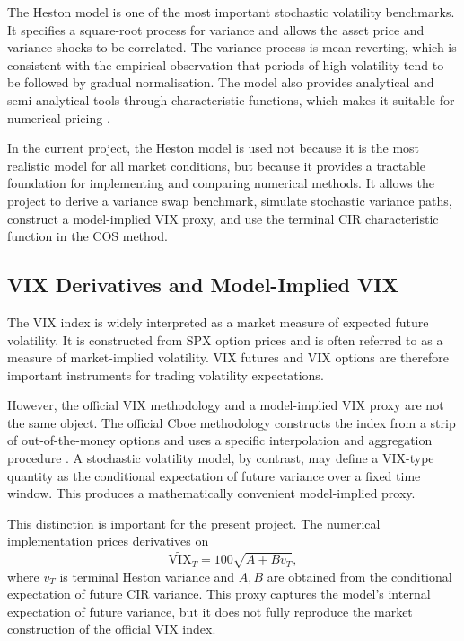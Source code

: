The Heston model is one of the most important stochastic volatility benchmarks. It specifies a square-root process for variance and allows the asset price and variance shocks to be correlated. The variance process is mean-reverting, which is consistent with the empirical observation that periods of high volatility tend to be followed by gradual normalisation. The model also provides analytical and semi-analytical tools through characteristic functions, which makes it suitable for numerical pricing \citep{hirsa2024}.

In the current project, the Heston model is used not because it is the most realistic model for all market conditions, but because it provides a tractable foundation for implementing and comparing numerical methods. It allows the project to derive a variance swap benchmark, simulate stochastic variance paths, construct a model-implied VIX proxy, and use the terminal CIR characteristic function in the COS method.

\subsection{VIX Derivatives and Model-Implied VIX}

The VIX index is widely interpreted as a market measure of expected future volatility. It is constructed from SPX option prices and is often referred to as a measure of market-implied volatility. VIX futures and VIX options are therefore important instruments for trading volatility expectations.

However, the official VIX methodology and a model-implied VIX proxy are not the same object. The official Cboe methodology constructs the index from a strip of out-of-the-money options and uses a specific interpolation and aggregation procedure \citep{cboe2024vix}. A stochastic volatility model, by contrast, may define a VIX-type quantity as the conditional expectation of future variance over a fixed time window. This produces a mathematically convenient model-implied proxy.

This distinction is important for the present project. The numerical implementation prices derivatives on
\[
\widetilde{\mathrm{VIX}}_T
=
100\sqrt{A+Bv_T},
\]
where \(v_T\) is terminal Heston variance and \(A,B\) are obtained from the conditional expectation of future CIR variance. This proxy captures the model's internal expectation of future variance, but it does not fully reproduce the market construction of the official VIX index.

